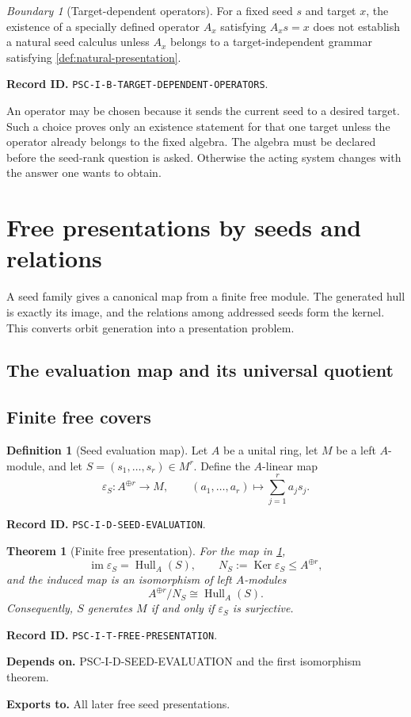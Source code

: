 \documentclass[11pt]{article}
\newtheorem{theorem}{Theorem}[section]
\theoremstyle{definition}
\newtheorem{definition}[definition]{Definition}
\theoremstyle{remark}
\newtheorem{boundary}[boundary]{Boundary}
\newcommand{\Hull}{\operatorname{Hull}}
\newcommand{\im}{\operatorname{im}}
\newcommand{\Ker}{\operatorname{Ker}}
\newcommand{\RecordID}[1]{\par\smallskip\noindent\begingroup\footnotesize\color{PSCGray}\raggedright\textbf{Record ID.} \nolinkurl{#1}.\par\endgroup}
\newcommand{\Depends}[1]{\par\noindent\begingroup\footnotesize\color{PSCGray}\raggedright\textbf{Depends on.} #1\par\endgroup}
\newcommand{\Exports}[1]{\par\noindent\begingroup\footnotesize\color{PSCGray}\raggedright\textbf{Exports to.} #1\par\endgroup}
\begin{document}
\begin{boundary}[Target-dependent operators]
\label{bnd:target-dependent-operators}
For a fixed seed $s$ and target $x$, the existence of a specially defined operator $A_x$ satisfying $A_xs=x$ does not establish a natural seed calculus unless $A_x$ belongs to a target-independent grammar satisfying \cref{def:natural-presentation}.
\end{boundary}
\RecordID{PSC-I-B-TARGET-DEPENDENT-OPERATORS}

\begin{warningbox}
An operator may be chosen because it sends the current seed to a desired target.  Such a choice proves only an existence statement for that one target unless the operator already belongs to the fixed algebra.  The algebra must be declared before the seed-rank question is asked.  Otherwise the acting system changes with the answer one wants to obtain.
\end{warningbox}


\section{Free presentations by seeds and relations}
\begin{readerroadmap}
A seed family gives a canonical map from a finite free module.  The generated hull is exactly its image, and the relations among addressed seeds form the kernel.  This converts orbit generation into a presentation problem.
\end{readerroadmap}
\subsection{The evaluation map and its universal quotient}

\subsection{Finite free covers}
\begin{definition}[Seed evaluation map]
\label{def:seed-evaluation}
Let $A$ be a unital ring, let $M$ be a left $A$-module, and let $S=(s_1,\ldots,s_r)\in M^r$.  Define the $A$-linear map
\[
\varepsilon_S:A^{\oplus r}\longrightarrow M,
\qquad
(a_1,\ldots,a_r)\longmapsto\sum_{j=1}^{r}a_js_j.
\]
\end{definition}
\RecordID{PSC-I-D-SEED-EVALUATION}

\begin{theorem}[Finite free presentation]
\label{thm:free-presentation}
For the map in \cref{def:seed-evaluation},
\[
\im\varepsilon_S=\Hull_A(S),
\qquad
N_S:=\Ker\varepsilon_S\leq A^{\oplus r},
\]
and the induced map is an isomorphism of left $A$-modules
\[
\boxed{A^{\oplus r}/N_S\cong\Hull_A(S).}
\]
Consequently, $S$ generates $M$ if and only if $\varepsilon_S$ is surjective.
\end{theorem}
\RecordID{PSC-I-T-FREE-PRESENTATION}
\Depends{PSC-I-D-SEED-EVALUATION and the first isomorphism theorem.}
\Exports{All later free seed presentations.}
\end{document}
